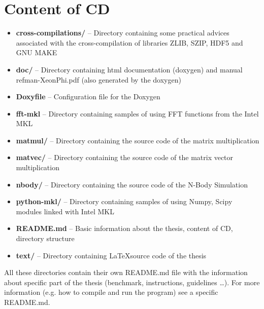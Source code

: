 \chapter{Content of CD}
\label{appendix}
\begin{itemize}
\item \textbf{cross-compilations/} -- Directory containing some practical advices associated with the cross-compilation of libraries ZLIB, SZIP, HDF5 and GNU MAKE

\item \textbf{doc/} -- Directory containing html documentation (doxygen) and manual refman-XeonPhi.pdf (also generated by the doxygen)

\item \textbf{Doxyfile} -- Configuration file for the Doxygen

\item \textbf{fft-mkl} -- Directory containing samples of using FFT functions from the Intel MKL

\item \textbf{matmul/} -- Directory containing the source code of the matrix multiplication

\item \textbf{matvec/} -- Directory containing the source code of the matrix vector multiplication

\item \textbf{nbody/} -- Directory containing the source code of the N-Body Simulation

\item \textbf{python-mkl/} -- Directory containing samples of using Numpy, Scipy modules linked with Intel MKL

\item \textbf{README.md} -- Basic information about the thesis, content of CD, directory structure

\item \textbf{text/} -- Directory containing \LaTeX source code of the thesis 
\end{itemize}

All these directories contain their own README.md file with the information about specific part of the thesis (benchmark, instructions, guidelines \dots). For more information (e.g. how to compile and run the program) see a specific README.md.
